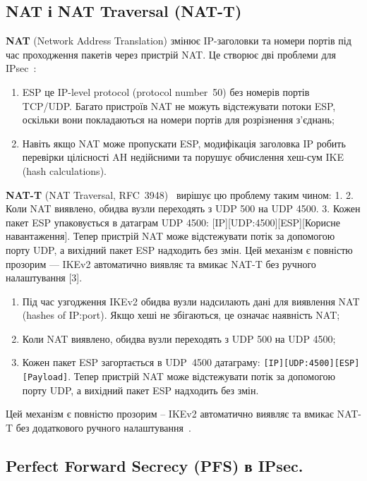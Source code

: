 \subsection*{NAT і NAT Traversal (NAT-T)}

\textbf{NAT} (Network Address Translation) змінює IP-заголовки та номери портів під час проходження пакетів через
пристрій NAT. Це створює дві проблеми для IPsec~\cite{rfc3948}:

\begin{enumerate}
    \item ESP це IP-level protocol (protocol number~50) без номерів портів TCP/UDP. Багато пристроїв NAT не можуть 
        відстежувати потоки ESP, оскільки вони покладаються на номери портів для розрізнення з’єднань;
    \item Навіть якщо NAT може пропускати ESP, модифікація заголовка IP робить перевірки цілісності AH недійсними 
        та порушує обчислення хеш-сум IKE (hash calculations).
\end{enumerate}

\textbf{NAT-T} (NAT Traversal, RFC~3948)~\cite{rfc3948} вирішує цю проблему таким чином:
1. 
2. Коли NAT виявлено, обидва вузли переходять з UDP 500 на UDP 4500.
3. Кожен пакет ESP упаковується в датаграм UDP 4500: [IP][UDP:4500][ESP][Корисне навантаження].
Тепер пристрій NAT може відстежувати потік за допомогою порту UDP, а вихідний пакет ESP надходить
без змін.
Цей механізм є повністю прозорим — IKEv2 автоматично виявляє та вмикає NAT-T без ручного
налаштування [3].

\begin{enumerate}
    \item Під час узгодження IKEv2 обидва вузли надсилають дані для виявлення NAT (hashes of IP:port). 
        Якщо хеші не збігаються, це означає наявність NAT;
    \item Коли NAT виявлено, обидва вузли переходять з UDP 500 на UDP 4500;
    \item Кожен пакет ESP загортається в UDP~4500 датаграму:
        \texttt{[IP][UDP:4500][ESP][Payload]}. Тепер пристрій NAT може відстежувати потік за допомогою порту 
        UDP, а вихідний пакет ESP надходить без змін.
\end{enumerate}

Цей механізм є повністю прозорим -- IKEv2 автоматично виявляє та вмикає NAT-T без додаткового ручного налаштування~\cite{rfc7296}.

\subsection*{Perfect Forward Secrecy (PFS) в IPsec.}

